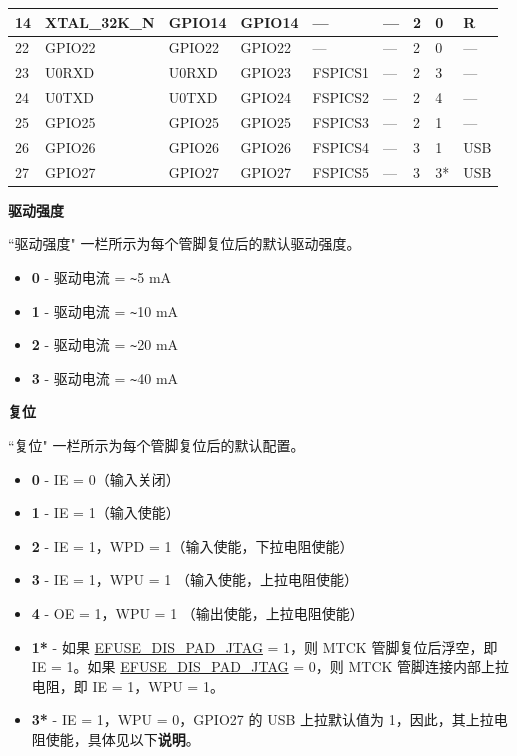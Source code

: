 \begin{longtable}[c]{|p{0.7cm}|p{1.9cm}|p{1.9cm}|p{1.6cm}|p{1.6cm}|p{1.6cm}|p{1cm}|p{1cm}|p{1.2cm}| }
14 & XTAL\_32K\_N    & GPIO14        & GPIO14  & ---          & ---            & 2           & 0 & R \\ \hline
22 & GPIO22          & GPIO22        & GPIO22  & ---          & ---            & 2           & 0 & --- \\ \hline
23 & U0RXD           & U0RXD         & GPIO23  & FSPICS1      & ---            & 2           & 3 & --- \\ \hline
24 & U0TXD           & U0TXD         & GPIO24  & FSPICS2      & ---            & 2           & 4 & --- \\ \hline
25 & GPIO25          & GPIO25        & GPIO25  & FSPICS3      & ---            & 2           & 1 & --- \\ \hline
26 & GPIO26          & GPIO26        & GPIO26  & FSPICS4      & ---            & 3           & 1 & USB \\ \hline
27 & GPIO27          & GPIO27        & GPIO27  & FSPICS5      & ---            & 3           & 3* & USB \\ \hline


    \end{longtable}
\normalsize

\textbf{驱动强度}

``驱动强度" 一栏所示为每个管脚复位后的默认驱动强度。

\begin{itemize}
\item \textbf{0} - 驱动电流 = \verb+~+5 mA
\item \textbf{1} - 驱动电流 = \verb+~+10 mA
\item \textbf{2} - 驱动电流 = \verb+~+20 mA
\item \textbf{3} - 驱动电流 = \verb+~+40 mA
\end{itemize}

\textbf{复位}

``复位" 一栏所示为每个管脚复位后的默认配置。

\begin{itemize}
\item \textbf{0} - IE = 0（输入关闭）
\item \textbf{1} - IE = 1（输入使能）
\item \textbf{2} - IE = 1，WPD = 1（输入使能，下拉电阻使能）
\item \textbf{3} - IE = 1，WPU = 1 （输入使能，上拉电阻使能）
\item \textbf{4} - OE = 1，WPU = 1 （输出使能，上拉电阻使能）
\item \textbf{1*} - 如果 \hyperref[fielddesc:EFUSEDISPADJTAG]{EFUSE\_DIS\_PAD\_JTAG} = 1，则 MTCK 管脚复位后浮空，即 IE = 1。如果 \hyperref[fielddesc:EFUSEDISPADJTAG]{EFUSE\_DIS\_PAD\_JTAG} = 0，则 MTCK 管脚连接内部上拉电阻，即 IE = 1，WPU = 1。
\item \textbf{3*} - IE = 1，WPU = 0，GPIO27 的 USB 上拉默认值为 1，因此，其上拉电阻使能，具体见以下\textbf{说明}。
\end{itemize}

